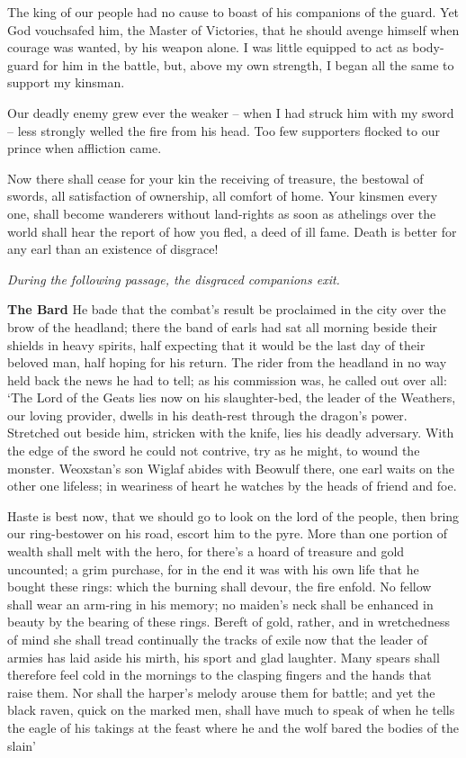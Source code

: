 \documentclass[a4paper]{article}
\begin{document}
{The king of our people had no cause to boast
of his companions of the guard. Yet God vouchsafed him,
the Master of Victories, that he should avenge himself
when courage was wanted, by his weapon alone.
I was little equipped to act as body-guard
for him in the battle, but, above my own strength,
I began all the same to support my kinsman.

Our deadly enemy grew ever the weaker –
when I had struck him with my sword – less strongly welled
the fire from his head. Too few supporters
flocked to our prince when affliction came.

Now there shall cease for your kin the receiving of treasure,
the bestowal of swords, all satisfaction of ownership,
all comfort of home. Your kinsmen every one,
shall become wanderers without land-rights
as soon as athelings over the world
shall hear the report of how you fled,
a deed of ill fame. Death is better
for any earl than an existence of disgrace!

\centerline{\textit{During the following passage, the disgraced companions exit.}}

\textbf{The Bard} He bade that the combat’s result be proclaimed in the city
over the brow of the headland; there the band of earls
had sat all morning beside their shields
in heavy spirits, half expecting
that it would be the last day of their beloved man,
half hoping for his return. The rider from the headland
in no way held back the news he had to tell;
as his commission was, he called out over all:
‘The Lord of the Geats lies now on his slaughter-bed,
the leader of the Weathers, our loving provider,
dwells in his death-rest through the dragon’s power.
Stretched out beside him, stricken with the knife,
lies his deadly adversary. With the edge of the sword
he could not contrive, try as he might,
to wound the monster. Weoxstan’s son
Wiglaf abides with Beowulf there,
one earl waits on the other one lifeless;
in weariness of heart he watches by the heads
of friend and foe.

Haste is best now,
that we should go to look on the lord of the people,
then bring our ring-bestower on his road,
escort him to the pyre. More than one portion of wealth
shall melt with the hero, for there’s a hoard of treasure
and gold uncounted; a grim purchase,
for in the end it was with his own life
that he bought these rings: which the burning shall devour,
the fire enfold. No fellow shall wear
an arm-ring in his memory; no maiden’s neck
shall be enhanced in beauty by the bearing of these rings.
Bereft of gold, rather, and in wretchedness of mind
she shall tread continually the tracks of exile
now that the leader of armies has laid aside his mirth,
his sport and glad laughter. Many spears shall therefore
feel cold in the mornings to the clasping fingers
and the hands that raise them. Nor shall the harper’s melody
arouse them for battle; and yet the black raven,
quick on the marked men, shall have much to speak of
when he tells the eagle of his takings at the feast
where he and the wolf bared the bodies of the slain’

}
\end{document}
